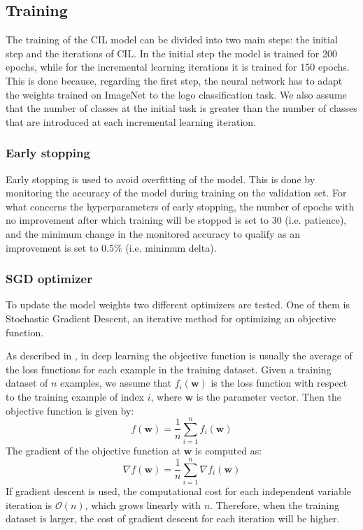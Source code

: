\subsection{Training}
The training of the CIL model can be divided into two main steps: the initial step and the iterations of CIL. In the initial step the model is trained for 200 epochs, while for the incremental learning iterations it is trained for 150 epochs. 
This is done because, regarding the first step, the neural network has to adapt the weights trained on ImageNet to the logo classification task. We also assume that the number of classes at the initial task is greater than the number of classes that are introduced at each incremental learning iteration.


\subsubsection{Early stopping}
Early stopping is used to avoid overfitting of the model. This is done by monitoring the accuracy of the model during training on the validation set. For what concerns the hyperparameters of  early stopping, the number of epochs with no improvement after which training will be stopped is set to 30 (i.e. patience), and the minimum change in the monitored accuracy to qualify as an improvement is set to 0.5\% (i.e. minimum delta).

\subsubsection{SGD optimizer}
To update the model weights two different optimizers are tested. One of them is Stochastic Gradient Descent, an iterative method for optimizing an objective function.

As described in \cite{zhang2021dive}, in deep learning the objective function is usually the average of the loss functions for each example in the training dataset. Given a training dataset of $n$ examples, we assume that $f_i(\textbf{w})$ is the loss function with respect to the training example of index $i$, where $\textbf{w}$ is the parameter vector. Then the objective function is given by:
\begin{equation}
    f(\textbf{w}) = \frac{1}{n} \sum_{i=1}^n f_i(\textbf{w})
\end{equation}
The gradient of the objective function at $\textbf{w}$ is computed as:
\begin{equation}
    \nabla f(\textbf{w}) = \frac{1}{n} \sum_{i=1}^n \nabla f_i(\textbf{w})
\end{equation}
If gradient descent is used, the computational cost for each independent variable iteration is $\mathcal{O}(n)$, which grows linearly with $n$. Therefore, when the training dataset is larger, the cost of gradient descent for each iteration will be higher.

